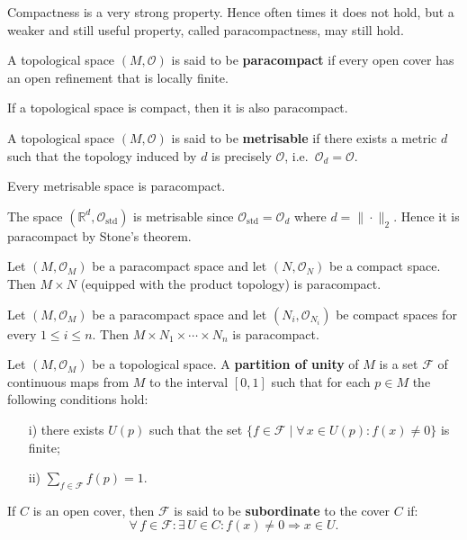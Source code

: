 \documentclass[root.tex]{subfiles}
\begin{document}
Compactness is a very strong property. Hence often times it does not hold, but a weaker and still useful property, called paracompactness, may still hold.

\begin{mydef}
A topological space $(M,\mathcal{O})$ is said to be \textbf{paracompact} if every open cover has an open refinement that is locally finite.
\end{mydef}

\begin{corollary}
If a topological space is compact, then it is also paracompact.
\end{corollary}

\begin{mydef}
A topological space $(M,\mathcal{O})$ is said to be \textbf{metrisable} if there exists a metric $d$ such that the topology induced by $d$ is precisely $\mathcal{O}$, i.e.\ $\mathcal{O}_d=\mathcal{O}$. 
\end{mydef}

\begin{theorem}[Stone]
Every metrisable space is paracompact.
\end{theorem}

\begin{myex}
The space $(\mathbb{R}^d,\mathcal{O}_\mathrm{std})$ is metrisable since $\mathcal{O}_\mathrm{std}=\mathcal{O}_d$ where $d = \|\cdot\|_2$. Hence it is paracompact by Stone's theorem.
\end{myex}

\begin{theorem}
Let $(M,\mathcal{O}_M)$ be a paracompact space and let $(N,\mathcal{O}_N)$ be a compact space. Then $M\times N$ (equipped with the product topology) is paracompact.
\end{theorem}

\begin{corollary}
Let $(M,\mathcal{O}_M)$ be a paracompact space and let $(N_i,\mathcal{O}_{N_i})$ be compact spaces for every $1\leq i \leq n$. Then $M\times N_1\times\cdots\times N_n$ is paracompact.
\end{corollary}

\begin{mydef}
  Let $(M,\mathcal{O}_M)$ be a topological space. A \textbf{partition of unity}  of $M$ is a set $\mathcal{F}$ of continuous maps from $M$ to the interval $[0,1]$ such that for each $p\in M$ the following conditions hold:
\begin{enumerate}
\item[i)] there exists $U(p)$ such that the set $\{f \in \mathcal{F} \mid \forall \, x \in U(p):f(x)\neq 0\}$ is finite;
\item[ii)] $\sum_{f\in \mathcal{F}}f(p)=1$.
\end{enumerate}
If $C$ is an open cover, then $\mathcal{F}$ is said to be \textbf{subordinate} to the cover $C$ if:
$$
\forall \, f \in \mathcal{F} : \exists \, U \in C : f(x) \neq 0 \Rightarrow x \in U .
$$
\end{mydef}
\end{document}
